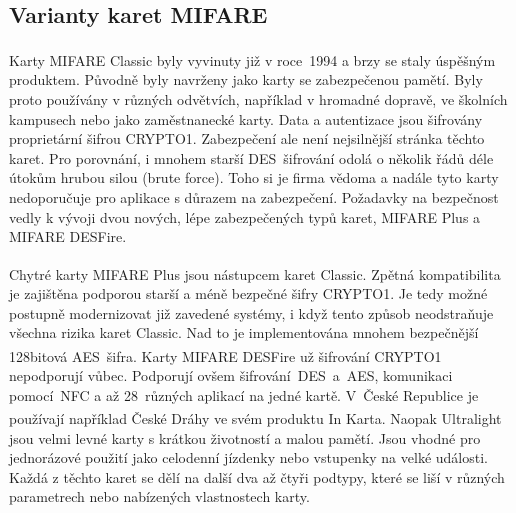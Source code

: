 \subsection{Varianty karet MIFARE}

Karty MIFARE Classic\textsuperscript{\textregistered} byly vyvinuty již v roce~1994 a brzy se staly úspěšným produktem. Původně byly navrženy jako karty se zabezpečenou pamětí. Byly proto používány v různých odvětvích, například v hromadné dopravě, ve školních kampusech nebo jako zaměstnanecké karty. Data a autentizace jsou šifrovány proprietární šifrou CRYPTO1. Zabezpečení ale není nejsilnější stránka těchto karet. Pro porovnání, i mnohem starší DES~šifrování odolá o několik řádů déle útokům hrubou silou (brute force). Toho si je firma vědoma a nadále tyto karty nedoporučuje pro aplikace s důrazem na zabezpečení. Požadavky na bezpečnost vedly k vývoji dvou nových, lépe zabezpečených typů karet, MIFARE Plus a MIFARE DESFire\cite{Mifare_Classic_story}\cite{MIFARE_Classic_Official_about}. 
\par
Chytré karty MIFARE Plus\textsuperscript{\textregistered} jsou nástupcem karet Classic. Zpětná kompatibilita je zajištěna podporou starší a méně bezpečné šifry CRYPTO1. Je tedy možné postupně modernizovat již zavedené systémy, i když tento způsob neodstraňuje všechna rizika karet Classic. Nad to je implementována mnohem bezpečnější 128bitová AES~šifra\cite{MIFARE_Plus_Official}. Karty MIFARE DESFire\textsuperscript{\textregistered} už šifrování CRYPTO1 nepodporují vůbec. Podporují ovšem šifrování~DES~a~AES, komunikaci pomocí~NFC a až 28~různých aplikací na jedné kartě\cite{MIFARE_DESFire_Official}. V~České Republice je používají například České Dráhy ve svém produktu In Karta\cite{Ceske_Drahy_Podminky_InKarta}. Naopak Ultralight\textsuperscript{\textregistered} jsou velmi levné karty s krátkou životností a malou pamětí. Jsou vhodné pro jednorázové použití jako celodenní jízdenky nebo vstupenky na velké události\cite{MIFARE_Ultralight_Official}. Každá z těchto karet se dělí na další dva až čtyři podtypy, které se liší v různých parametrech nebo nabízených vlastnostech karty.

